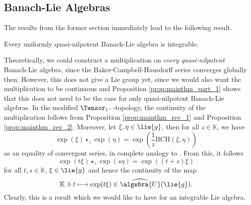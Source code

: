 \documentclass[
11pt,                          %
english                        %
]{article}
\newcommand{\bch}[2]{\mathrm{BCH}\left(#1, #2\right)}
\begin{document}
\subsection{Banach-Lie Algebras}
The results from the former section immediately lead to the following result.
\begin{corollary}
	Every uniformly quasi-nilpotent Banach-Lie algebra is integrable.
\end{corollary}
Theoretically, we could construct a multiplication on \emph{every quasi-nilpotent}
Banach-Lie algebra, since the Baker-Campbell-Hausdorff series converges globally 
then. However, this does not give a Lie group yet, since we would also want the 
multiplication to be continuous and Proposition \ref{prop:mainthm_part_1} shows that 
this does not need to be the case for only quasi-nilpotent Banach-Lie algebras. In 
the modified $\Tensor_{1^-}$-topology, the continuity of the multiplication follows 
from Proposition \ref{prop:mainthm_rev_1} and Proposition \ref{prop:mainthm_rev_2}. 
Moreover, let $\xi, \eta \in \lie{g}$, then for all $z \in \mathbb{K}$, we have
\begin{equation}
	\exp(\xi) \star_z \exp(\eta)
	=
	\exp\left(
		\frac{1}{z}
		\bch{\xi}{\eta}
	\right)
\end{equation}
as an equality of convergent series, in complete analogy to 
\cite[Corollary 4.3]{esposito.stapor.waldmann:2015a:pre}. From this, it follows
\begin{equation}
	\exp(t \xi) \star_z \exp(s \eta)
	=
	\exp((t + s) \xi)
\end{equation}
for all $t,s \in \mathbb{K}$, $\xi \in \lie{g}$ and hence the continuity of the map
\begin{equation}
	\mathbb{K}
	\ni
	t
	\longmapsto
	\exp(t \xi)
	\in
	\widehat{\algebra{U}}(\lie{g}).
\end{equation}
Clearly, this is a result which we would like to have for an integrable Lie algebra.
\end{document}
